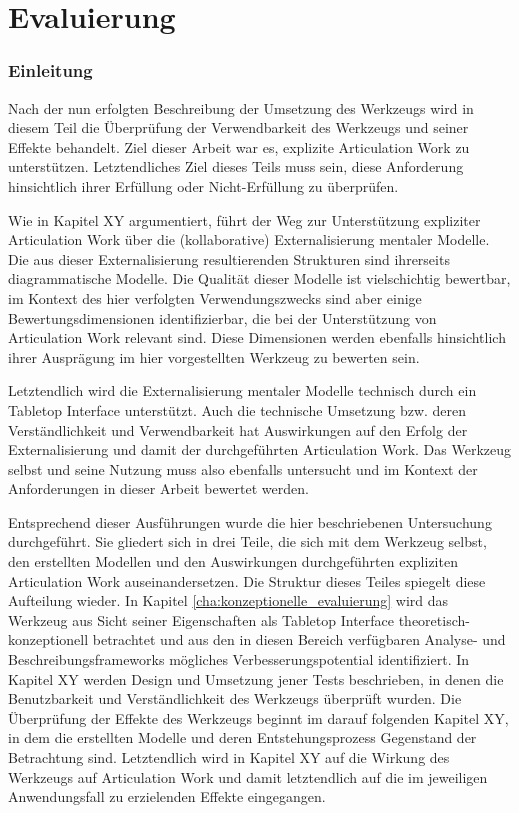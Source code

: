\part{Evaluierung} %
\label{prt:evaluierung}

\section*{Einleitung} %
\label{sec:evaluierung_einleitung}
\thispagestyle{empty}

Nach der nun erfolgten Beschreibung der Umsetzung des Werkzeugs wird in diesem Teil die Überprüfung der Verwendbarkeit des Werkzeugs und seiner Effekte behandelt. Ziel dieser Arbeit war es, explizite Articulation Work zu unterstützen. Letztendliches Ziel dieses Teils muss sein, diese Anforderung hinsichtlich ihrer Erfüllung oder Nicht-Erfüllung zu überprüfen. 

Wie in Kapitel XY argumentiert, führt der Weg zur Unterstützung expliziter Articulation Work über die (kollaborative) Externalisierung mentaler Modelle. Die aus dieser Externalisierung resultierenden Strukturen sind ihrerseits diagrammatische Modelle. Die Qualität dieser Modelle ist vielschichtig bewertbar, im Kontext des hier verfolgten Verwendungszwecks sind aber einige Bewertungsdimensionen identifizierbar, die bei der Unterstützung von Articulation Work relevant sind. Diese Dimensionen werden ebenfalls hinsichtlich ihrer Ausprägung im hier vorgestellten Werkzeug zu bewerten sein. 

Letztendlich wird die Externalisierung mentaler Modelle technisch durch ein Tabletop Interface unterstützt. Auch die technische Umsetzung bzw. deren Verständlichkeit und Verwendbarkeit hat Auswirkungen auf den Erfolg der Externalisierung und damit der durchgeführten Articulation Work. Das Werkzeug selbst und seine Nutzung muss also ebenfalls untersucht und im Kontext der Anforderungen in dieser Arbeit bewertet werden. 

Entsprechend dieser Ausführungen wurde die hier beschriebenen Untersuchung durchgeführt. Sie gliedert sich in drei Teile, die sich mit dem Werkzeug selbst, den erstellten Modellen und den Auswirkungen durchgeführten expliziten Articulation Work auseinandersetzen. Die Struktur dieses Teiles spiegelt diese Aufteilung wieder. In Kapitel \ref{cha:konzeptionelle_evaluierung} wird das Werkzeug aus Sicht seiner Eigenschaften als Tabletop Interface theoretisch-konzeptionell betrachtet und aus den in diesen Bereich verfügbaren Analyse- und Beschreibungsframeworks mögliches Verbesserungspotential identifiziert. In Kapitel XY werden Design und Umsetzung jener Tests beschrieben, in denen die Benutzbarkeit und Verständlichkeit des Werkzeugs überprüft wurden. Die Überprüfung der Effekte des Werkzeugs beginnt im darauf folgenden Kapitel XY, in dem die erstellten Modelle und deren Entstehungsprozess Gegenstand der Betrachtung sind. Letztendlich wird in Kapitel XY auf die Wirkung des Werkzeugs auf Articulation Work und damit letztendlich auf die im jeweiligen Anwendungsfall zu erzielenden Effekte eingegangen.










%
%


